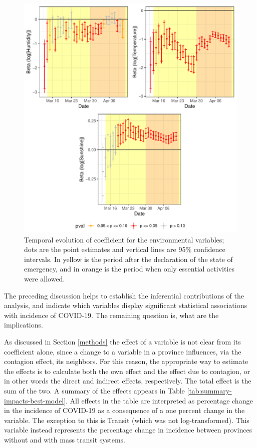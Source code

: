 \documentclass[]{elsarticle} %
\makeatletter
\def\maxwidth{\ifdim\Gin@nat@width>\linewidth\linewidth
\else\Gin@nat@width\fi}
\let\Oldincludegraphics\includegraphics
\renewcommand{\includegraphics}[1]{\Oldincludegraphics[width=\maxwidth]{#1}}
\makeatother
\begin{document}
\begin{figure}
\centering
\includegraphics{Environmental-Correlates-of-COVID19-Spain_files/figure-latex/beta-environmental-time-1.pdf}
\caption{\label{fig:beta-environmental-time}Temporal evolution of
coefficient for the environmental variables; dots are the point
estimates and vertical lines are 95\% confidence intervals. In yellow is
the period after the declaration of the state of emergency, and in
orange is the period when only essential activities were allowed.}
\end{figure}

The preceding discussion helps to establish the inferential
contributions of the analysis, and indicate which variables display
significant statistical associations with incidence of COVID-19. The
remaining question is, what are the implications.

As discussed in Section \ref{methods} the effect of a variable is not
clear from its coefficient alone, since a change to a variable in a
province influences, via the contagion effect, its neighbors. For this
reason, the appropriate way to estimate the effects is to calculate both
the own effect and the effect due to contagion, or in other words the
direct and indirect effects, respectively. The total effect is the sum
of the two. A summary of the effects appears in Table
\ref{tab:summary-impacts-best-model}. All effects in the table are
interpreted as percentage change in the incidence of COVID-19 as a
consequence of a one percent change in the variable. The exception to
this is Transit (which was not log-transformed). This variable instead
represents the percentage change in incidence between provinces without
and with mass transit systems.
\end{document}
